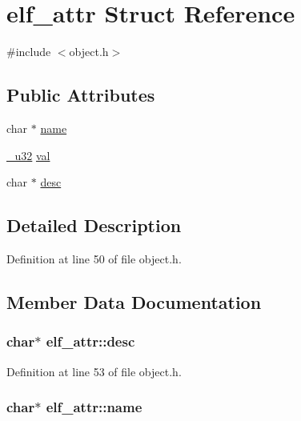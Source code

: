 \hypertarget{structelf__attr}{
\section{elf\_\-attr Struct Reference}
\label{structelf__attr}
}


{\ttfamily \#include $<$object.h$>$}

\subsection*{Public Attributes}
\begin{DoxyCompactItemize}
\item 
char $\ast$ \hyperlink{structelf__attr_ad8de4c841c3e8f615d67b901e3c68ae5}{name}
\item 
\hyperlink{types_8h_a07491c35a48354e0e7b56974a04cc3de}{\_\-u32} \hyperlink{structelf__attr_a1037d17b61bedc1b06f93b421076b053}{val}
\item 
char $\ast$ \hyperlink{structelf__attr_a224c7350bbf47a873783b51f0551f05d}{desc}
\end{DoxyCompactItemize}


\subsection{Detailed Description}


Definition at line 50 of file object.h.



\subsection{Member Data Documentation}
\hypertarget{structelf__attr_a224c7350bbf47a873783b51f0551f05d}{
\subsubsection[{desc}]{\setlength{\rightskip}{0pt plus 5cm}char$\ast$ {\bf elf\_\-attr::desc}}}
\label{structelf__attr_a224c7350bbf47a873783b51f0551f05d}


Definition at line 53 of file object.h.

\hypertarget{structelf__attr_ad8de4c841c3e8f615d67b901e3c68ae5}{
\subsubsection[{name}]{\setlength{\rightskip}{0pt plus 5cm}char$\ast$ {\bf elf\_\-attr::name}}}
\label{structelf__attr_ad8de4c841c3e8f615d67b901e3c68ae5}


